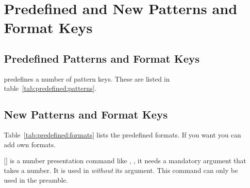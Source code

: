 \documentclass[load-preamble+]{cnltx-doc}
\begin{document}
\section{Predefined and New Patterns and Format Keys}
\subsection{Predefined Patterns and Format Keys}
\cntformats{} predefines a number of pattern keys. These are listed in
table~\ref{tab:predefined:patterns}.

\subsection{New Patterns and Format Keys}
Table~\ref{tab:predefined:formats} lists the predefined formats.  If you want
you can add own formats.
\begin{commands}
  []
     is a number presentation command like , \ie,
    it needs a mandatory argument that takes a number.  It is used in
     \emph{without} its argument.  This command can only be used
    in the preamble.
\end{commands}
\end{document}
